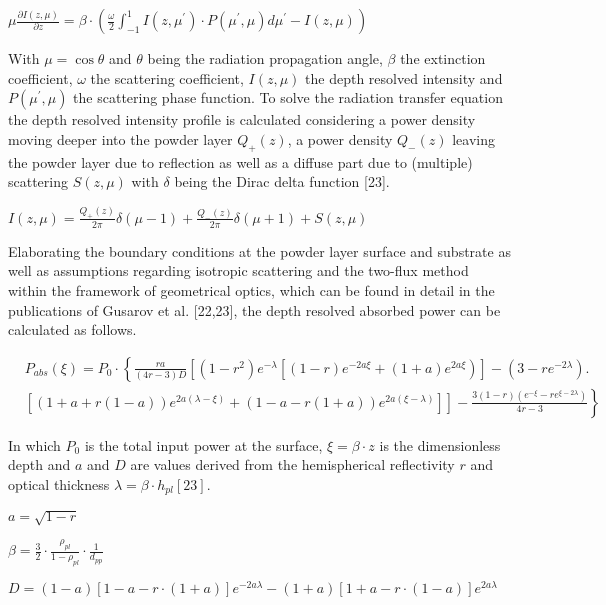 \documentclass[10pt]{article}
\begin{document}
$\mu \frac{\partial I(z, \mu)}{\partial z}=\beta \cdot\left(\frac{\omega}{2} \int_{-1}^{1} I\left(z, \mu^{\prime}\right) \cdot P\left(\mu^{\prime}, \mu\right) d \mu^{\prime}-I(z, \mu)\right)$

With $\mu=\cos \theta$ and $\theta$ being the radiation propagation angle, $\beta$ the extinction coefficient, $\omega$ the scattering coefficient, $I(z, \mu)$ the depth resolved intensity and $P\left(\mu^{\prime}, \mu\right)$ the scattering phase function. To solve the radiation transfer equation the depth resolved intensity profile is calculated considering a power density moving deeper into the powder layer $Q_{+}(z)$, a power density $Q_{-}(z)$ leaving the powder layer due to reflection as well as a diffuse part due to (multiple) scattering $S(z, \mu)$ with $\delta$ being the Dirac delta function [23].

$I(z, \mu)=\frac{Q_{+}(z)}{2 \pi} \delta(\mu-1)+\frac{Q_{-}(z)}{2 \pi} \delta(\mu+1)+S(z, \mu)$

Elaborating the boundary conditions at the powder layer surface and substrate as well as assumptions regarding isotropic scattering and the two-flux method within the framework of geometrical optics, which can be found in detail in the publications of Gusarov et al. [22,23], the depth resolved absorbed power can be calculated as follows.


\begin{align*}
& P_{a b s}(\xi)=P_{0} \cdot\left\{\frac{r a}{(4 r-3) D}\left[\left(1-r^{2}\right) e^{-\lambda}\left[(1-r) e^{-2 a \xi}+(1+a) e^{2 a \xi}\right)\right]-\left(3-r e^{-2 \lambda}\right) .\right. \\
& \left.\left.\left[(1+a+r(1-a)) e^{2 a(\lambda-\xi)}+(1-a-r(1+a)) e^{2 a(\xi-\lambda)}\right]\right]-\frac{3(1-r)\left(e^{-\xi}-r e^{\xi-2 \lambda}\right)}{4 r-3}\right\} \tag{4}
\end{align*}


In which $P_{0}$ is the total input power at the surface, $\xi=\beta \cdot z$ is the dimensionless depth and $a$ and $D$ are values derived from the hemispherical reflectivity $r$ and optical thickness $\lambda=\beta \cdot h_{p l}[23]$.

$a=\sqrt{1-r}$

$\beta=\frac{3}{2} \cdot \frac{\rho_{p l}}{1-\rho_{p l}} \cdot \frac{1}{d_{p p}}$

$D=(1-a)[1-a-r \cdot(1+a)] e^{-2 a \lambda}-(1+a)[1+a-r \cdot(1-a)] e^{2 a \lambda}$
\end{document}
